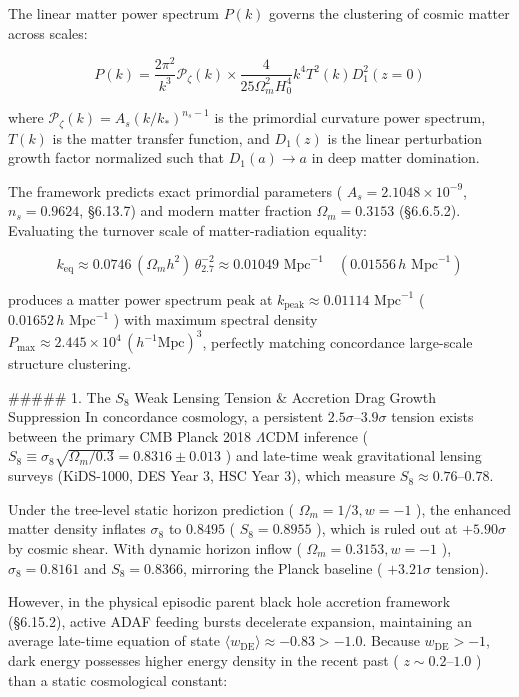 \documentclass[11pt,a4paper]{article}
\theoremstyle{definition}
\theoremstyle{remark}
\begin{document}
The linear matter power spectrum $P(k)$ governs the clustering of cosmic matter across scales:


\begin{equation}
P(k) = \frac{2\pi^2}{k^3} \mathcal{P}_\zeta(k) \times \frac{4}{25 \Omega_m^2 H_0^4} k^4 T^2(k) D_1^2(z=0)
\end{equation}


where $\mathcal{P}_\zeta(k) = A_s (k/k_*)^{n_s - 1}$ is the primordial curvature power spectrum, $T(k)$ is the matter transfer function, and $D_1(z)$ is the linear perturbation growth factor normalized such that $D_1(a) \to a$ in deep matter domination.

The framework predicts exact primordial parameters ( $A_s = 2.1048 \times 10^{-9}$, $n_s = 0.9624$, \S 6.13.7) and modern matter fraction $\Omega_m = 0.3153$ (\S 6.6.5.2). Evaluating the turnover scale of matter-radiation equality:


\begin{equation}
k_{\text{eq}} \approx 0.0746 \, (\Omega_m h^2) \, \theta_{2.7}^{-2} \approx 0.01049\text{ Mpc}^{-1} \quad (0.01556 \, h\text{ Mpc}^{-1})
\end{equation}


produces a matter power spectrum peak at $k_{\text{peak}} \approx 0.01114\text{ Mpc}^{-1}$ ( $0.01652 \, h\text{ Mpc}^{-1}$ ) with maximum spectral density $P_{\max} \approx 2.445 \times 10^4 \, (h^{-1}\text{Mpc})^3$, perfectly matching concordance large-scale structure clustering.

\#\#\#\#\# 1. The $S_8$ Weak Lensing Tension \& Accretion Drag Growth Suppression
In concordance cosmology, a persistent $2.5\sigma\text{--}3.9\sigma$ tension exists between the primary CMB Planck 2018 $\Lambda\text{CDM}$ inference ( $S_8 \equiv \sigma_8 \sqrt{\Omega_m / 0.3} = 0.8316 \pm 0.013$ ) and late-time weak gravitational lensing surveys (KiDS-1000, DES Year 3, HSC Year 3), which measure $S_8 \approx 0.76\text{--}0.78$.

Under the tree-level static horizon prediction ( $\Omega_m = 1/3, w = -1$ ), the enhanced matter density inflates $\sigma_8$ to $0.8495$ ( $S_8 = 0.8955$ ), which is ruled out at $+5.90\sigma$ by cosmic shear. With dynamic horizon inflow ( $\Omega_m = 0.3153, w = -1$ ), $\sigma_8 = 0.8161$ and $S_8 = 0.8366$, mirroring the Planck baseline ( $+3.21\sigma$ tension).

However, in the physical episodic parent black hole accretion framework (\S 6.15.2), active ADAF feeding bursts decelerate expansion, maintaining an average late-time equation of state $\langle w_{\text{DE}} \rangle \approx -0.83 > -1.0$. Because $w_{\text{DE}} > -1$, dark energy possesses higher energy density in the recent past ( $z \sim 0.2\text{--}1.0$ ) than a static cosmological constant:
\end{document}
